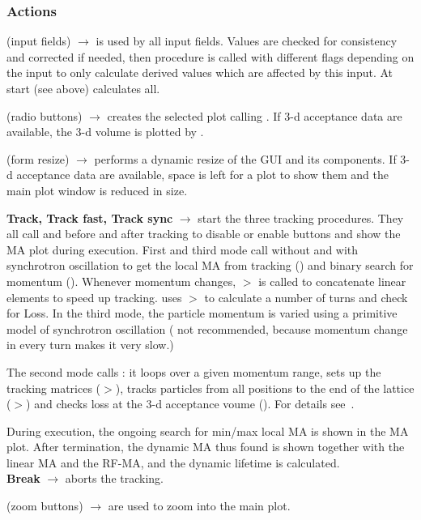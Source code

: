\documentclass[12pt]{article}
\newcommand\code[1]{{\tt #1}}
\newcommand{\ofld}[1]{\colorbox{black!15}{{{\color{black}\bf #1}}}}
\newcommand{\ofldx}[1]{\colorbox{black!15}{{\color{black}(#1)}}}
\newcommand\guico[1]{{\color{blue}\code{#1}}}
\newcommand{\unico}[1]{{\color{burntorange}\code{#1}}}
\newcommand{\evcod}[2]{\ofld{#1} $\rightarrow$ \guico{#2}}
\newcommand{\evcodx}[2]{\ofldx{#1} $\rightarrow$ \guico{#2}}
\newcommand{\prcod}[2]{\opauni{#1}$>$\unico{#2}}
\newcommand{\opauni}[1]{\colorbox{orange!30}{{\color{black}\code{#1}}}}
\newcommand{\act}[1]{\subsubsection*{Actions} #1}
\newcommand{\todo}[1]{{\color{red} #1}}
\begin{document}
\act{}
\evcodx{input fields}{edin\_Action} is used by all input fields. Values are checked for consistency and corrected if needed, then procedure \guico{Output} is called with different flags depending on the input to only calculate derived values which are affected by this input. At start (see above) \guico{Output} calculates all.

\evcodx{radio buttons}{rbClicked} creates the selected plot calling \guico{MakePlot}. If 3-d acceptance data are available, the 3-d volume is plotted by \guico{FloFigPlot}.

\evcodx{form resize}{ResizeAll} performs a dynamic resize of the GUI and its components. If 3-d acceptance data are available, space is left for a plot to show them and the main plot window is reduced in size.

\evcod{Track, Track fast, Track sync}{but(t,t\_F,t\_S)Click} start the three tracking procedures. They all call \guico{beforeTracking} and \guico{afterTrackin} before and after tracking to disable or enable buttons and show the MA plot during execution. First and third mode call \guico{TrackMAdyn} without and with synchrotron oscillation to get the local MA from tracking (\guico{TrackLat}) and binary search for momentum (\guico{Trackdbins}). Whenever momentum changes,  \prcod{tracklib}{TrackingMatrix} is called to concatenate linear elements to speed up tracking. \guico{TrackLat} uses \prcod{tracklib}{OneTurn} to calculate a number of turns and check for Loss. In the third mode, the particle momentum is varied using a primitive model of synchrotron oscillation (\todo{not recommended, because momentum change in every turn makes it very slow.})

The second mode calls \guico{TrackMA\_FTT}: it loops over a given momentum range, sets up the tracking matrices (\prcod{tracklib}{TrackingMatrix}), tracks particles from all positions to the end of the lattice (\prcod{tracklib}{TrackToEnd}) and checks loss at the 3-d acceptance voume (\guico{checkFloP}). For details see~\cite{FTTpaper}.

During execution, the ongoing search for min/max local MA is shown in the MA plot. After termination, the dynamic MA thus found is shown together with the linear MA and the RF-MA, and the dynamic lifetime is calculated.\\[1ex]

\evcod{Break}{butBreakClick} aborts the tracking.

\evcodx{zoom buttons}{butPlot[V]ZoomClick} are used to zoom into the main plot.
\end{document}
